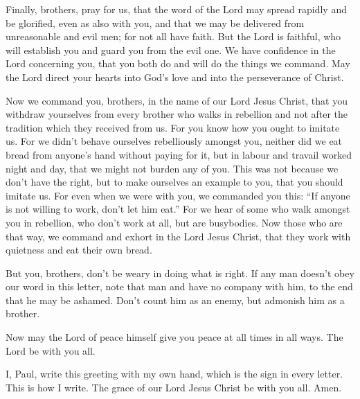  Finally, brothers, pray for us, that the word of the Lord
may spread rapidly and be glorified, even as also with you,
 and that we may be delivered from unreasonable and evil
men; for not all have faith.  But the Lord is faithful,
who will establish you and guard you from the evil one. 
We have confidence in the Lord concerning you, that you both do and will
do the things we command.  May the Lord direct your hearts
into God's love and into the perseverance of Christ.

 Now we command you, brothers, in the name of our Lord
Jesus Christ, that you withdraw yourselves from every brother who walks
in rebellion and not after the tradition which they received from us.
 For you know how you ought to imitate us. For we didn't
behave ourselves rebelliously amongst you,  neither did we
eat bread from anyone's hand without paying for it, but in labour and
travail worked night and day, that we might not burden any of you.
 This was not because we don't have the right, but to make
ourselves an example to you, that you should imitate us. 
For even when we were with you, we commanded you this: ``If anyone is
not willing to work, don't let him eat.''  For we hear of
some who walk amongst you in rebellion, who don't work at all, but are
busybodies.  Now those who are that way, we command and
exhort in the Lord Jesus Christ, that they work with quietness and eat
their own bread.

 But you, brothers, don't be weary in doing what is
right.  If any man doesn't obey our word in this letter,
note that man and have no company with him, to the end that he may be
ashamed.  Don't count him as an enemy, but admonish him
as a brother.

 Now may the Lord of peace himself give you peace at all
times in all ways. The Lord be with you all.

 I, Paul, write this greeting with my own hand, which is
the sign in every letter. This is how I write.  The grace
of our Lord Jesus Christ be with you all. Amen.
